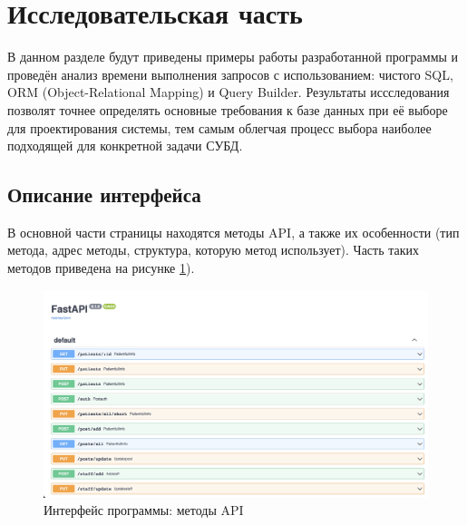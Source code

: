 \section{\large Исследовательская часть}
\label{cha:research}

В данном разделе будут приведены примеры работы разработанной программы и проведён анализ времени выполнения запросов с использованием: чистого SQL, ORM (Object-Relational Mapping) и Query Builder. Результаты иссследования позволят точнее определять основные требования к базе данных при её выборе для проектирования системы, тем самым облегчая процесс выбора наиболее подходящей для конкретной задачи СУБД.	


\subsection{Описание интерфейса}

В основной части страницы находятся методы API, а также их особенности (тип метода, адрес методы, структура, которую метод использует). Часть таких методов приведена на рисунке \ref{fig:interface-1}). 
\begin{figure}[h]
	\centering
	\captionsetup{justification=centering}
	\includegraphics[width=170mm]{img/interface.png}
	\caption{Интерфейс программы: методы API}
	\label{fig:interface-1}
\end{figure}

